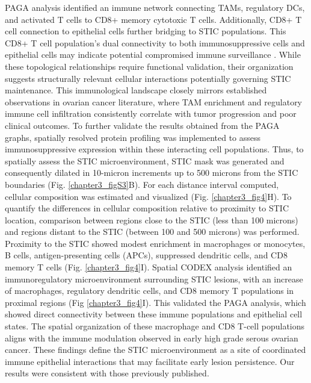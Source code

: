 \begin{refsection}
    PAGA analysis identified an immune network connecting TAMs, regulatory DCs, and activated T cells to CD8+ memory cytotoxic T cells. Additionally, CD8+ T cell connection to epithelial cells further bridging to STIC populations. This CD8+ T cell population's dual connectivity to both immunosuppressive cells and epithelial cells may indicate potential compromised immune surveillance \cite{Xu2024Spatiotemporal,Yeh2024Mapping,Vazquez2022Ovarian}. While these topological relationships require functional validation, their organization suggests structurally relevant cellular interactions potentially governing STIC maintenance\cite{Mikulak2025Immune}. This immunological landscape closely mirrors established observations in ovarian cancer literature, where TAM enrichment and regulatory immune cell infiltration consistently correlate with tumor progression and poor clinical outcomes\cite{Kader2025Multimodal,Unraveling,Wang2025TAM,Yang2025Tumor}. 
    To further validate the results obtained from the PAGA graphs, spatially resolved protein profiling was implemented to assess immunosuppressive expression within these interacting cell populations. Thus, to spatially assess the STIC microenvironment, STIC mask was generated and consequently dilated in 10-micron increments up to 500 microns from the STIC boundaries (Fig. \ref{chapter3_figS3}B). For each distance interval computed, cellular composition was estimated and visualized (Fig. \ref{chapter3_fig4}H). To quantify the differences in cellular composition relative to proximity to STIC location, comparison between regions close to the STIC (less than 100 microns) and regions distant to the STIC (between 100 and 500 microns) was performed. Proximity to the STIC showed modest enrichment in macrophages or monocytes, B cells, antigen-presenting cells (APCs), suppressed dendritic cells, and CD8 memory T cells (Fig. \ref{chapter3_fig4}I).
    Spatial CODEX analysis identified an immunoregulatory microenvironment surrounding STIC lesions, with an increase of macrophages, regulatory dendritic cells, and CD8 memory T populations in proximal regions (Fig \ref{chapter3_fig4}I). This validated the PAGA analysis, which showed direct connectivity between these immune populations and epithelial cell states. The spatial organization of these macrophage and CD8 T-cell populations aligns with the immune modulation observed in early high grade serous ovarian cancer\cite{Kader2025Multimodal}. These findings define the STIC microenvironment as a site of coordinated immune epithelial interactions that may facilitate early lesion persistence. Our results were consistent with those previously published\cite{Ardighieri2014Characterization}.


\end{refsection}
